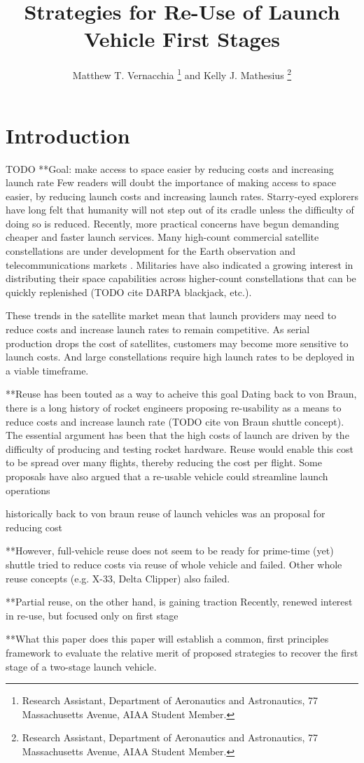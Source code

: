 \documentclass[conf]{new-aiaa}
\title{Strategies for Re-Use of Launch Vehicle First Stages}
\author{Matthew T. Vernacchia \footnote{Research Assistant, Department of Aeronautics and Astronautics, 77 Massachusetts Avenue, AIAA Student Member.}
and Kelly J. Mathesius  \footnote{Research Assistant, Department of Aeronautics and Astronautics, 77 Massachusetts Avenue, AIAA Student Member.}}
\affil{Massachusetts Institute of Technology, Cambridge, MA, 02139}
\begin{document}
\maketitle

\section{Introduction}

TODO
**Goal: make access to space easier by reducing costs and increasing launch rate
Few readers will doubt the importance of making access to space easier, by reducing launch costs and increasing launch rates. Starry-eyed explorers have long felt that humanity will not step out of its cradle unless the difficulty of doing so is reduced. Recently, more practical concerns have begun demanding cheaper and faster launch services. Many high-count commercial satellite constellations are under development for the Earth observation and telecommunications markets \cite{SIA2017, Henry2017}. Militaries have also indicated a growing interest in distributing their space capabilities across higher-count constellations that can be quickly replenished (TODO cite DARPA blackjack, etc.).

These trends in the satellite market mean that launch providers may need to reduce costs and increase launch rates to remain competitive. As serial production drops the cost of satellites, customers may become more sensitive to launch costs. And large constellations require high launch rates to be deployed in a viable timeframe.


**Reuse has been touted as a way to acheive this goal
Dating back to von Braun, there is a long history of rocket engineers proposing re-usability as a means to reduce costs and increase launch rate (TODO cite von Braun shuttle concept). The essential argument has been that the high costs of launch are driven by the difficulty of producing and testing rocket hardware. Reuse would enable this cost to be spread over many flights, thereby reducing the cost per flight. Some proposals have also argued that a re-usable vehicle could streamline launch operations

historically back to von braun reuse of launch vehicles was an proposal for reducing cost

**However, full-vehicle reuse does not seem to be ready for prime-time (yet)
shuttle tried to reduce costs via reuse of whole vehicle and failed. Other whole reuse concepts (e.g. X-33, Delta Clipper) also failed.

**Partial reuse, on the other hand, is gaining traction
Recently, renewed interest in re-use, but focused only on first stage

**What this paper does
this paper will establish a common, first principles framework to evaluate the relative merit of proposed strategies to recover the first stage of a two-stage launch vehicle. 



\end{document}
